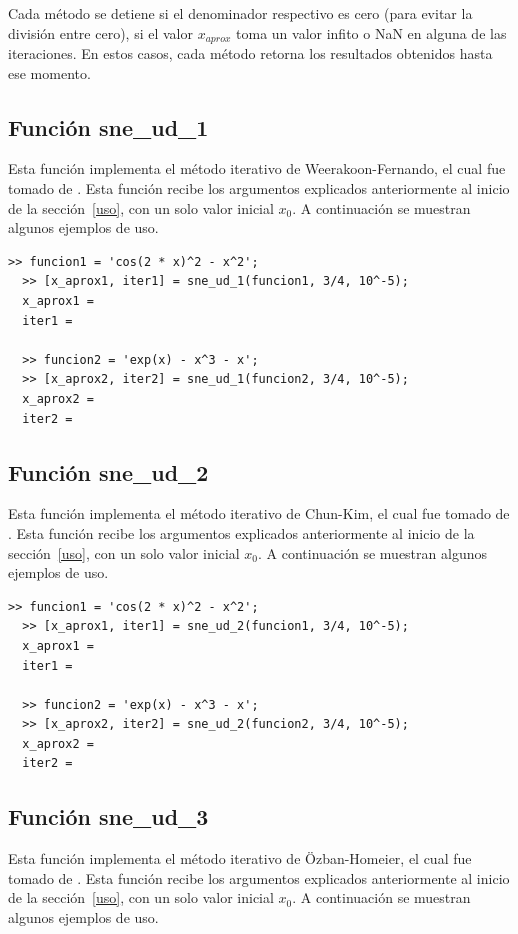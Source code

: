 \documentclass[12pt]{article}
\begin{document}
Cada método se detiene si el denominador respectivo es cero (para evitar la división entre cero), si el valor $x_{aprox}$ toma un valor infito o NaN en alguna de las iteraciones. En estos casos, cada método retorna los resultados obtenidos hasta ese momento.

\subsection{Función sne\_ud\_1}
Esta función implementa el método iterativo de Weerakoon-Fernando, el cual fue tomado de \cite{kiran2015performance}. Esta función recibe los argumentos explicados anteriormente al inicio de la sección~\ref{uso}, con un solo valor inicial $x_{0}$. A continuación se muestran algunos ejemplos de uso.

\begin{minipage}{\linewidth}
\begin{lstlisting}[frame = single]
  >> funcion1 = 'cos(2 * x)^2 - x^2';
  >> [x_aprox1, iter1] = sne_ud_1(funcion1, 3/4, 10^-5);
  x_aprox1 = 
  iter1 = 

  >> funcion2 = 'exp(x) - x^3 - x';
  >> [x_aprox2, iter2] = sne_ud_1(funcion2, 3/4, 10^-5);
  x_aprox2 = 
  iter2 = 

\end{lstlisting}
\end{minipage}

\subsection{Función sne\_ud\_2}
Esta función implementa el método iterativo de Chun-Kim, el cual fue tomado de \cite{kiran2015performance}. Esta función recibe los argumentos explicados anteriormente al inicio de la sección~\ref{uso}, con un solo valor inicial $x_{0}$. A continuación se muestran algunos ejemplos de uso.

\begin{minipage}{\linewidth}
\begin{lstlisting}[frame = single]
  >> funcion1 = 'cos(2 * x)^2 - x^2';
  >> [x_aprox1, iter1] = sne_ud_2(funcion1, 3/4, 10^-5);
  x_aprox1 = 
  iter1 = 

  >> funcion2 = 'exp(x) - x^3 - x';
  >> [x_aprox2, iter2] = sne_ud_2(funcion2, 3/4, 10^-5);
  x_aprox2 = 
  iter2 = 

\end{lstlisting}
\end{minipage}

\subsection{Función sne\_ud\_3}
Esta función implementa el método iterativo de Özban-Homeier, el cual fue tomado de \cite{kiran2015performance}. Esta función recibe los argumentos explicados anteriormente al inicio de la sección~\ref{uso}, con un solo valor inicial $x_{0}$. A continuación se muestran algunos ejemplos de uso.
\end{document}
